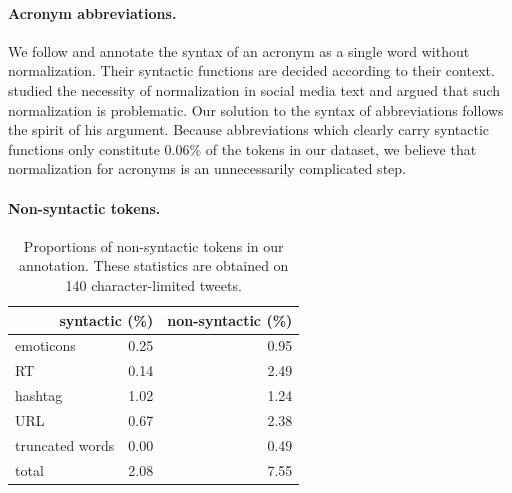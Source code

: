 \documentclass[11pt,a4paper]{article}
\newcommand{\yjcomment}[1]{\textcolor{orange}{[$_\mathrm{L}^\mathrm{Y}$#1]}}
\newcommand{\nascomment}[1]{\textcolor{blue}{[#1 ---\textsc{nas}]}}
\newcommand{\yicomment}[1]{\textcolor{gray}{[#1 ---\textsc{yi}]}}
\begin{document}
\paragraph{Acronym abbreviations.}  %
We follow \citet{kong-EtAl:2014:EMNLP2014} and annotate the
syntax of an acronym as a single word without normalization. Their syntactic functions
are decided according to their context. \citet{eisenstein:2013:NAACL-HLT} studied the necessity of normalization
in social media text and argued that such normalization is problematic.
Our solution to the syntax of abbreviations follows the spirit of his argument. Because abbreviations which clearly carry
syntactic functions only constitute 0.06\% of the tokens in our
dataset, we believe that normalization for acronyms is an unnecessarily complicated
step.


\paragraph{Non-syntactic tokens.}  
\begin{table}
\centering
\begin{tabular}{lrr}
\hline
\multicolumn{2}{r}{syntactic (\%)} & non-syntactic (\%)\\ \hline
emoticons & 0.25 & 0.95 \\
RT & 0.14 & 2.49\\
hashtag & 1.02 & 1.24 \\
URL & 0.67 & 2.38 \\
truncated words & 0.00 & 0.49 \\
 \hline
 total & 2.08 & 7.55 \\
 \hline
\end{tabular}
\caption{Proportions of non-syntactic tokens in our annotation. %
These statistics are obtained on 140 character-limited tweets. \label{tbl:non-synt-prop}}
\end{table}
\end{document}
